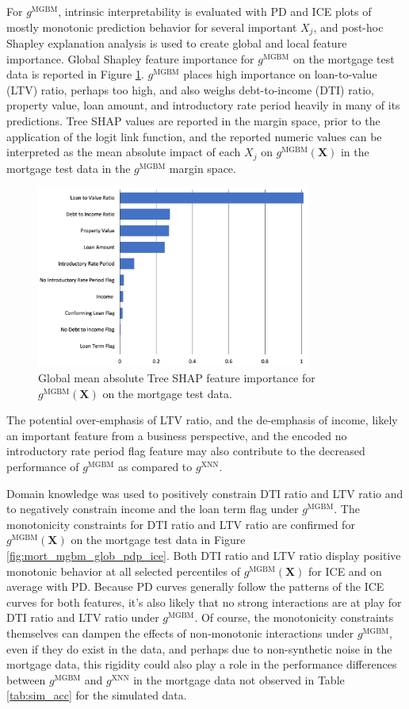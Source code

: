 \documentclass[information,article,submit,moreauthors,pdftex]{definitions/mdpi}
\begin{document}
For $g^\text{MGBM}$, intrinsic interpretability is evaluated with PD and ICE plots of mostly monotonic prediction behavior for several important $X_j$, and post-hoc Shapley explanation analysis is used to create global and local feature importance. Global Shapley feature importance for $g^\text{MGBM}$ on the mortgage test data is reported in Figure \ref{fig:mort_mgbm_glob}. $g^\text{MGBM}$ places high importance on loan-to-value (LTV) ratio, perhaps too high, and also weighs debt-to-income (DTI) ratio, property value, loan amount, and introductory rate period heavily in many of its predictions. Tree SHAP values are reported in the margin space, prior to the application of the logit link function, and the reported numeric values can be interpreted as the mean absolute impact of each $X_j$ on $g^\text{MGBM}(\mathbf{X})$ in the mortgage test data in the $g^\text{MGBM}$ margin space. 

\begin{figure}[htb]
\centering
\includegraphics[width=9cm]{img/mort_mgbm_glob.png}
\caption{Global mean absolute Tree SHAP feature importance for $g^\text{MGBM}(\mathbf{X})$ on the mortgage test data.}
\label{fig:mort_mgbm_glob}
\end{figure} 

\noindent The potential over-emphasis of LTV ratio, and the de-emphasis of income, likely an important feature from a business perspective, and the encoded no introductory rate period flag feature may also contribute to the decreased performance of $g^\text{MGBM}$ as compared to $g^\text{XNN}$.

Domain knowledge was used to positively constrain DTI ratio and LTV ratio and to negatively constrain income and the loan term flag under $g^\text{MGBM}$. The monotonicity constraints for DTI ratio and LTV ratio are confirmed for $g^\text{MGBM}(\mathbf{X})$ on the mortgage test data in Figure \ref{fig:mort_mgbm_glob_pdp_ice}. Both DTI ratio and LTV ratio display positive monotonic behavior at all selected percentiles of $g^\text{MGBM}(\mathbf{X})$ for ICE and on average with PD. Because PD curves generally follow the patterns of the ICE curves for both features, it's also likely that no strong interactions are at play for DTI ratio and LTV ratio under $g^\text{MGBM}$. Of course, the monotonicity constraints themselves can dampen the effects of non-monotonic interactions under $g^\text{MGBM}$, even if they do exist in the data, and perhaps due to non-synthetic noise in the mortgage data, this rigidity could also play a role in the performance differences between $g^\text{MGBM}$ and $g^\text{XNN}$ in the mortgage data not observed in Table \ref{tab:sim_acc} for the simulated data. 
\end{document}
